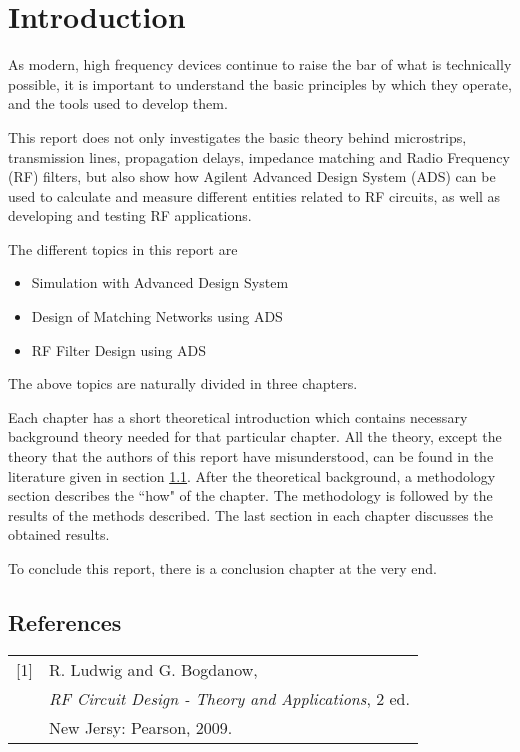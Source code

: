 \documentclass[report.tex]{subfiles}
\begin{document}
\pagebreak \section{Introduction}
As modern, high frequency devices continue to raise the bar of what is technically possible, it is important to understand the basic principles by which they operate, and the tools used to develop them. 

This report does not only investigates the basic theory behind microstrips, transmission lines, propagation delays, impedance matching and Radio Frequency (RF) filters, but also show how Agilent Advanced Design System (ADS) can be used to calculate and measure different entities related to RF circuits, as well as developing and testing RF applications.

The different topics in this report are
\begin{itemize}
\item Simulation with Advanced Design System
\item Design of Matching Networks using ADS
\item RF Filter Design using ADS
\end{itemize}
The above topics are naturally divided in three chapters.

Each chapter has a short theoretical introduction which contains necessary background theory needed for that particular chapter. All the theory, except the theory that the authors of this report have misunderstood, can be found in the literature given in section \ref{subsec:References}.
After the theoretical background, a methodology section describes the ``how" of the chapter.
The methodology is followed by the results of the methods described.
The last section in each chapter discusses the obtained results.

To conclude this report, there is a conclusion chapter at the very end.

\subsection{References}\label{subsec:References}
\begin{table}[H]
	\begin{tabular}{l l}
		[1] & R. Ludwig and G. Bogdanow, \\
		& \textit{RF Circuit Design - Theory and Applications}, 2 ed. \\
		& New Jersy: Pearson, 2009.
	\end{tabular}
\end{table}
\end{document}

